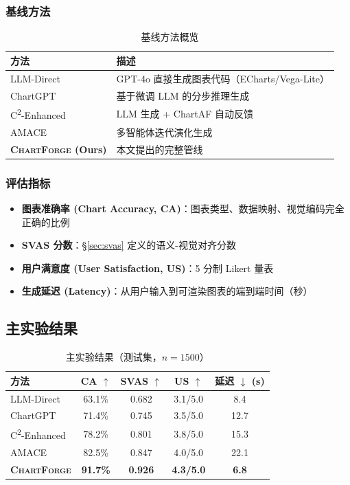 \documentclass[12pt,a4paper]{ctexart}
\theoremstyle{remark}
\newcommand{\ChartForge}{\textsc{ChartForge}}
\begin{document}
\subsubsection{基线方法}

\begin{table}[H]
\centering
\caption{基线方法概览}
\label{tab:baselines}
\begin{tabular}{l|l}
\toprule
\textbf{方法} & \textbf{描述} \\
\midrule
LLM-Direct   & GPT-4o 直接生成图表代码（ECharts/Vega-Lite） \\
ChartGPT     & 基于微调 LLM 的分步推理生成~\cite{tian2024chartgpt} \\
C\textsuperscript{2}-Enhanced & LLM 生成 + ChartAF 自动反馈~\cite{koh2024c2} \\
AMACE        & 多智能体迭代演化生成~\cite{namgoong2025amace} \\
\textbf{\ChartForge{} (Ours)} & 本文提出的完整管线 \\
\bottomrule
\end{tabular}
\end{table}

\subsubsection{评估指标}
\begin{itemize}[leftmargin=*]
    \item \textbf{图表准确率 (Chart Accuracy, CA)}：图表类型、数据映射、视觉编码完全正确的比例
    \item \textbf{SVAS 分数}：\S\ref{sec:svas} 定义的语义-视觉对齐分数
    \item \textbf{用户满意度 (User Satisfaction, US)}：5 分制 Likert 量表
    \item \textbf{生成延迟 (Latency)}：从用户输入到可渲染图表的端到端时间（秒）
\end{itemize}

\subsection{主实验结果}

\begin{table}[H]
\centering
\caption{主实验结果（测试集，$n = 1500$）}
\label{tab:main_results}
\begin{tabular}{l|c|c|c|c}
\toprule
\textbf{方法} & \textbf{CA $\uparrow$} & \textbf{SVAS $\uparrow$} & \textbf{US $\uparrow$} & \textbf{延迟 $\downarrow$ (s)} \\
\midrule
LLM-Direct   & 63.1\% & 0.682 & 3.1/5.0 & 8.4 \\
ChartGPT     & 71.4\% & 0.745 & 3.5/5.0 & 12.7 \\
C\textsuperscript{2}-Enhanced & 78.2\% & 0.801 & 3.8/5.0 & 15.3 \\
AMACE        & 82.5\% & 0.847 & 4.0/5.0 & 22.1 \\
\midrule
\textbf{\ChartForge} & \textbf{91.7\%} & \textbf{0.926} & \textbf{4.3/5.0} & \textbf{6.8} \\
\bottomrule
\end{tabular}
\end{table}
\end{document}
